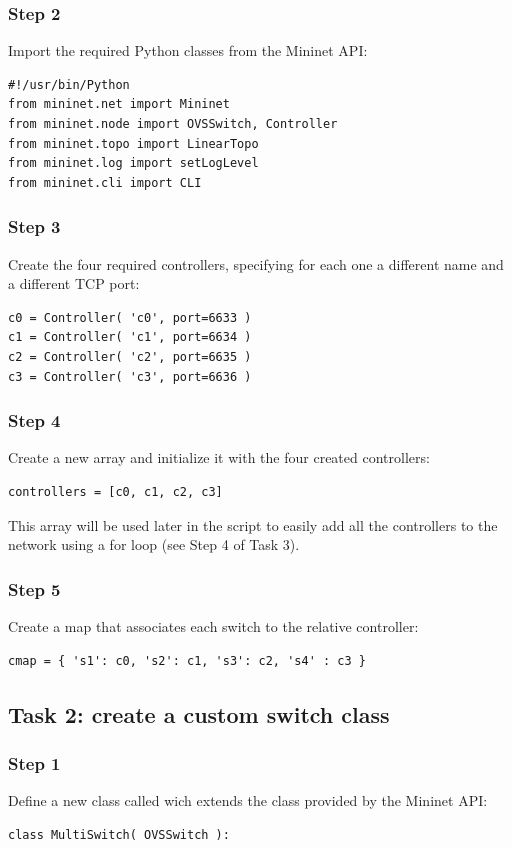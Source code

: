 \subsubsection*{Step 2}
Import the required Python classes from the Mininet API:
\begin{lstlisting}
#!/usr/bin/Python
from mininet.net import Mininet
from mininet.node import OVSSwitch, Controller
from mininet.topo import LinearTopo
from mininet.log import setLogLevel
from mininet.cli import CLI
\end{lstlisting}

\subsubsection*{Step 3}
Create the four required controllers, specifying for each one a different name and
a different TCP port:
\begin{lstlisting}
c0 = Controller( 'c0', port=6633 )
c1 = Controller( 'c1', port=6634 )
c2 = Controller( 'c2', port=6635 )
c3 = Controller( 'c3', port=6636 )
\end{lstlisting}

\subsubsection*{Step 4}
Create a new array and initialize it with the four created controllers:
\begin{lstlisting}
controllers = [c0, c1, c2, c3]
\end{lstlisting}
This array will be used later in the script to easily add all the controllers
to the network using a for loop (see Step 4 of Task 3).

\subsubsection*{Step 5}
Create a map that associates each switch to the relative controller:
\begin{lstlisting}
cmap = { 's1': c0, 's2': c1, 's3': c2, 's4' : c3 }
\end{lstlisting}






\subsection*{Task 2: create a custom switch class}
\subsubsection*{Step 1}
Define a new class called  wich extends the class
 provided by the Mininet API:
\begin{lstlisting}
class MultiSwitch( OVSSwitch ):
\end{lstlisting}


